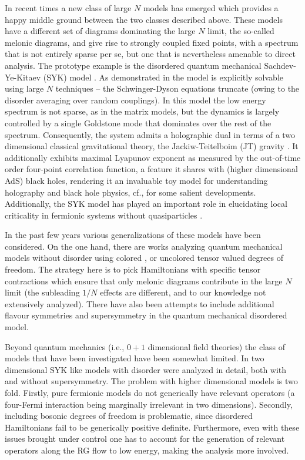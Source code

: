\documentclass[11pt]{article}
\begin{document}
In recent times  a new class of large $N$ models has emerged which provides a happy middle ground between the two classes described above. These models have a different set of diagrams dominating the large $N$ limit, the so-called melonic diagrams, and give rise to strongly coupled fixed points, with a spectrum that is not entirely sparse per se, but one that is nevertheless amenable to direct analysis. The prototype example is the disordered quantum mechanical Sachdev-Ye-Kitaev  (SYK) model \cite{Sachdev:1992fk,Kitaev:2015aa}. As demonstrated in \cite{Maldacena:2016hyu,Kitaev:2017awl} the model is explicitly solvable using large $N$ techniques -- the Schwinger-Dyson equations truncate (owing to the disorder averaging over random couplings). In this model the low energy spectrum is not sparse, as in the matrix models, but the dynamics is largely controlled by a single Goldstone mode that dominates over the rest of the spectrum. Consequently, the system admits a holographic dual in terms of a two dimensional classical gravitational theory, the Jackiw-Teitelboim (JT) gravity  \cite{Maldacena:2016upp,Jensen:2016pah,Kitaev:2017awl}. It additionally exhibits maximal Lyapunov exponent  \cite{Maldacena:2015waa} as measured by the out-of-time order four-point correlation function, a feature it shares with (higher dimensional AdS) black holes, rendering it an invaluable toy model for understanding holography and black hole physics, cf., \cite{Cotler:2016fpe,Maldacena:2018lmt,Saad:2018bqo} for some salient developments. Additionally, the SYK model has played an important role in elucidating local criticality in fermionic systems without quasiparticles \cite{Sachdev:2015efa,Esterlis:2021eth}.

In the past few years various  generalizations of these models have been considered. On the one hand, there are works analyzing quantum mechanical models without disorder using colored  \cite{Witten:2016iux,Bonzom:2011zz}, or uncolored \cite{Klebanov:2016xxf,Carrozza:2015adg} tensor valued degrees of freedom.  The strategy here is to pick Hamiltonians with specific tensor contractions which ensure that only melonic diagrams contribute in the large $N$ limit (the subleading $1/N$ effects are different, and to our knowledge not extensively analyzed). There  have also been attempts to include additional flavour symmetries \cite{Gross:2016kjj,Gu:2019jub} and supersymmetry \cite{Anninos:2016szt,Fu:2016vas} in the quantum mechanical disordered model. 

Beyond quantum mechanics (i.e., $0+1$ dimensional field theories) the class of models that have been investigated have been somewhat limited. In \cite{Murugan:2017eto} two dimensional SYK like models with disorder were analyzed in detail, both with and without supersymmetry. The problem with higher dimensional models is two fold. Firstly, pure fermionic models do not generically have relevant operators (a four-Fermi interaction being marginally irrelevant in two dimensions). Secondly, including  bosonic degrees of freedom is problematic, since disordered Hamiltonians fail to be generically positive definite. Furthermore, even with these issues brought under control one has to account for the generation of relevant operators along the RG flow to low energy, making the analysis more involved.
\end{document}
